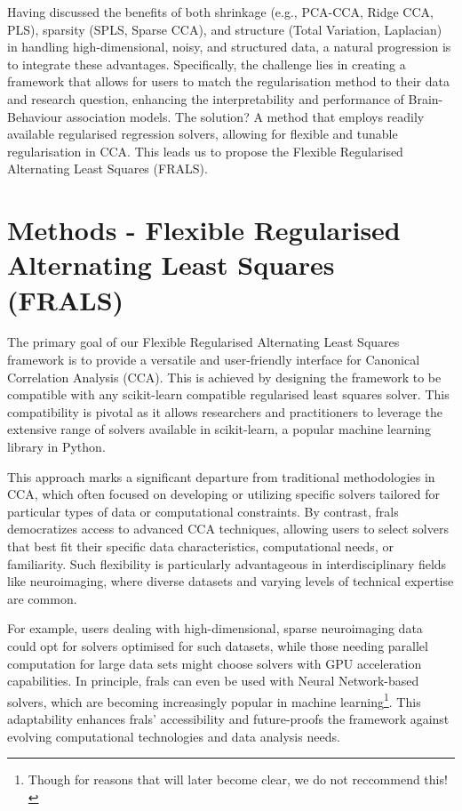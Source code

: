 Having discussed the benefits of both shrinkage (e.g., PCA-CCA, Ridge CCA, PLS), sparsity (SPLS, Sparse CCA), and structure (Total Variation, Laplacian) in handling high-dimensional, noisy, and structured data, a natural progression is to integrate these advantages.
Specifically, the challenge lies in creating a framework that allows for users to match the regularisation method to their data and research question, enhancing the interpretability and performance of Brain-Behaviour association models.
The solution?
A method that employs readily available regularised regression solvers, allowing for flexible and tunable regularisation in CCA.
This leads us to propose the Flexible Regularised Alternating Least Squares (FRALS).

\section{Methods - Flexible Regularised Alternating Least Squares (FRALS)}\label{subsec:flexible-regularised-alternating-least-squares-(frals)}

The primary goal of our Flexible Regularised Alternating Least Squares framework is to provide a versatile and user-friendly interface for Canonical Correlation Analysis (CCA). This is achieved by designing the framework to be compatible with any scikit-learn compatible regularised least squares solver. This compatibility is pivotal as it allows researchers and practitioners to leverage the extensive range of solvers available in scikit-learn, a popular machine learning library in Python.

This approach marks a significant departure from traditional methodologies in CCA, which often focused on developing or utilizing specific solvers tailored for particular types of data or computational constraints.
By contrast, \acrshort{frals} democratizes access to advanced CCA techniques, allowing users to select solvers that best fit their specific data characteristics, computational needs, or familiarity.
Such flexibility is particularly advantageous in interdisciplinary fields like neuroimaging, where diverse datasets and varying levels of technical expertise are common.

For example, users dealing with high-dimensional, sparse neuroimaging data could opt for solvers optimised for such datasets, while those needing parallel computation for large data sets might choose solvers with GPU acceleration capabilities.
In principle, \acrshort{frals} can even be used with Neural Network-based solvers, which are becoming increasingly popular in machine learning\footnote{Though for reasons that will later become clear, we do not reccommend this!}.
This adaptability enhances \acrshort{frals}' accessibility and future-proofs the framework against evolving computational technologies and data analysis needs.

